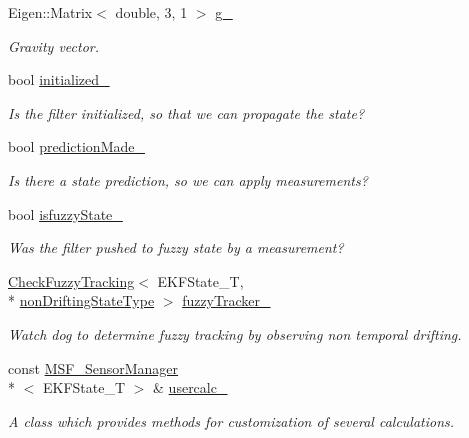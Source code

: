 \begin{DoxyCompactItemize}
Eigen\-::\-Matrix$<$ double, 3, 1 $>$ \hyperlink{classmsf__core_1_1MSF__Core_a703900170cc427768a4699b4b98bed53}{g\-\_\-}
\begin{DoxyCompactList}\small\item\em Gravity vector. \end{DoxyCompactList}\item 
bool \hyperlink{classmsf__core_1_1MSF__Core_a18790ea445cf51f8c5845dafcc2b4cb8}{initialized\-\_\-}
\begin{DoxyCompactList}\small\item\em Is the filter initialized, so that we can propagate the state? \end{DoxyCompactList}\item 
bool \hyperlink{classmsf__core_1_1MSF__Core_a545ca557edba6ceb0cdb31adfe0df709}{prediction\-Made\-\_\-}
\begin{DoxyCompactList}\small\item\em Is there a state prediction, so we can apply measurements? \end{DoxyCompactList}\item 
bool \hyperlink{classmsf__core_1_1MSF__Core_ad2feab0ef759136b599cc249049b833f}{isfuzzy\-State\-\_\-}
\begin{DoxyCompactList}\small\item\em Was the filter pushed to fuzzy state by a measurement? \end{DoxyCompactList}\item 
\hyperlink{classmsf__core_1_1CheckFuzzyTracking}{Check\-Fuzzy\-Tracking}$<$ E\-K\-F\-State\-\_\-\-T, \\*
\hyperlink{classmsf__core_1_1MSF__Core_aca5d903b57559980415221fa95f5f32b}{non\-Drifting\-State\-Type} $>$ \hyperlink{classmsf__core_1_1MSF__Core_a757f4815128ba065125141c533f143ff}{fuzzy\-Tracker\-\_\-}
\begin{DoxyCompactList}\small\item\em Watch dog to determine fuzzy tracking by observing non temporal drifting. \end{DoxyCompactList}\item 
const \hyperlink{classmsf__core_1_1MSF__SensorManager}{M\-S\-F\-\_\-\-Sensor\-Manager}\\*
$<$ E\-K\-F\-State\-\_\-\-T $>$ \& \hyperlink{classmsf__core_1_1MSF__Core_a77d5808555e74796738c6053be4ac1a9}{usercalc\-\_\-}
\begin{DoxyCompactList}\small\item\em A class which provides methods for customization of several calculations. \end{DoxyCompactList}\end{DoxyCompactItemize}
